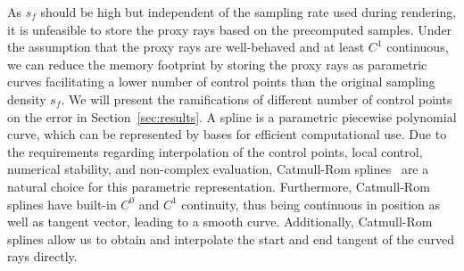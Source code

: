 \documentclass[journal]{vgtc}                %
\begin{document}

As $s_f$ should be high but independent of the sampling rate used during rendering, it is unfeasible to store the proxy rays based on the precomputed samples. Under the assumption that the proxy rays are well-behaved and at least $C^1$ continuous, we can reduce the memory footprint by storing the proxy rays as parametric curves facilitating a lower number of control points than the original sampling density $s_f$. We will present the ramifications of different number of control points on the error in Section~\ref{sec:results}. A spline is a parametric piecewise polynomial curve, which can be represented by bases for efficient computational use. Due to the requirements regarding interpolation of the control points, local control, numerical stability, and non-complex evaluation, Catmull-Rom splines~\cite{catmull74splines} are a natural choice for this parametric representation. Furthermore, Catmull-Rom splines have built-in $C^{0}$ and $C^{1}$ continuity, thus being continuous in position as well as tangent vector, leading to a smooth curve. Additionally, Catmull-Rom splines allow us to obtain and interpolate the start and end tangent of the curved rays directly.
\end{document}
